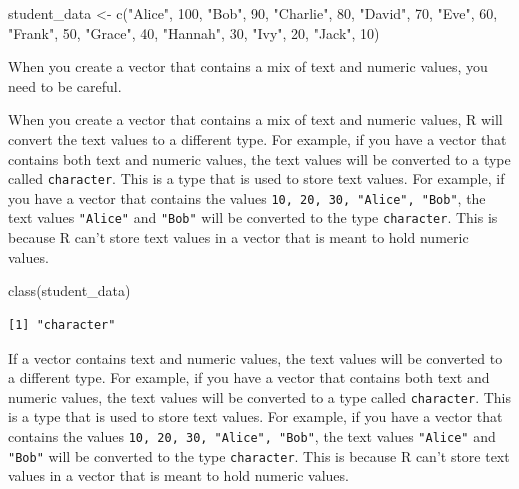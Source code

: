 \documentclass[
  letterpaper,
  DIV=11,
  numbers=noendperiod]{scrreprt}
\newenvironment{Shaded}{\begin{snugshade}}{\end{snugshade}}
\newcommand{\DecValTok}[1]{\textcolor[rgb]{0.68,0.00,0.00}{#1}}
\newcommand{\FunctionTok}[1]{\textcolor[rgb]{0.28,0.35,0.67}{#1}}
\newcommand{\NormalTok}[1]{\textcolor[rgb]{0.00,0.23,0.31}{#1}}
\newcommand{\OtherTok}[1]{\textcolor[rgb]{0.00,0.23,0.31}{#1}}
\newcommand{\StringTok}[1]{\textcolor[rgb]{0.13,0.47,0.30}{#1}}
\begin{document}
\begin{Shaded}
\begin{Highlighting}[]
\NormalTok{student\_data }\OtherTok{\textless{}{-}} \FunctionTok{c}\NormalTok{(}\StringTok{"Alice"}\NormalTok{, }\DecValTok{100}\NormalTok{, }\StringTok{"Bob"}\NormalTok{, }\DecValTok{90}\NormalTok{, }\StringTok{"Charlie"}\NormalTok{, }\DecValTok{80}\NormalTok{, }\StringTok{"David"}\NormalTok{, }\DecValTok{70}\NormalTok{, }\StringTok{"Eve"}\NormalTok{, }\DecValTok{60}\NormalTok{, }\StringTok{"Frank"}\NormalTok{, }\DecValTok{50}\NormalTok{, }\StringTok{"Grace"}\NormalTok{, }\DecValTok{40}\NormalTok{, }\StringTok{"Hannah"}\NormalTok{, }\DecValTok{30}\NormalTok{, }\StringTok{"Ivy"}\NormalTok{, }\DecValTok{20}\NormalTok{, }\StringTok{"Jack"}\NormalTok{, }\DecValTok{10}\NormalTok{)}
\end{Highlighting}
\end{Shaded}

When you create a vector that contains a mix of text and numeric values,
you need to be careful.

When you create a vector that contains a mix of text and numeric values,
R will convert the text values to a different type. For example, if you
have a vector that contains both text and numeric values, the text
values will be converted to a type called \texttt{character}. This is a
type that is used to store text values. For example, if you have a
vector that contains the values \texttt{10,\ 20,\ 30,\ "Alice",\ "Bob"},
the text values \texttt{"Alice"} and \texttt{"Bob"} will be converted to
the type \texttt{character}. This is because R can't store text values
in a vector that is meant to hold numeric values.

\begin{Shaded}
\begin{Highlighting}[]
\FunctionTok{class}\NormalTok{(student\_data)}
\end{Highlighting}
\end{Shaded}

\begin{verbatim}
[1] "character"
\end{verbatim}

If a vector contains text and numeric values, the text values will be
converted to a different type. For example, if you have a vector that
contains both text and numeric values, the text values will be converted
to a type called \texttt{character}. This is a type that is used to
store text values. For example, if you have a vector that contains the
values \texttt{10,\ 20,\ 30,\ "Alice",\ "Bob"}, the text values
\texttt{"Alice"} and \texttt{"Bob"} will be converted to the type
\texttt{character}. This is because R can't store text values in a
vector that is meant to hold numeric values.
\end{document}
